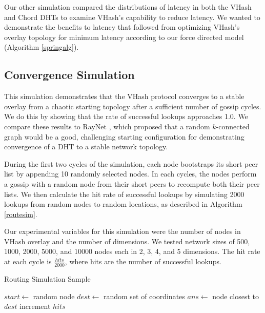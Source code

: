 \documentclass[10pt, conference, letterpaper]{IEEEtran}
\begin{document}
Our other simulation compared the distributions of latency in both the VHash and Chord DHTs to examine VHash's capability to reduce latency. 
We wanted to demonstrate the benefits to latency that followed from optimizing VHash's overlay topology for minimum latency according to our force directed model (Algorithm \ref{springalg}).

\subsection{Convergence Simulation}
This simulation demonstrates that the VHash protocol converges to a stable overlay from a chaotic starting topology after a sufficient number of gossip cycles.  
We do this by showing that the rate of successful lookups approaches 1.0.
We compare these results to RayNet \cite{raynet}, which proposed that a random $k$-connected graph would be a good, challenging starting configuration for demonstrating convergence of a DHT to a stable network topology.

During the first two cycles of the simulation, each node bootstraps its short peer list by appending 10 randomly selected nodes.
In each cycles, the nodes perform a gossip with a random node from their short peers to recompute both their peer lists.
We then calculate the hit rate of successful lookups by simulating 2000 lookups from random nodes to random locations, as described in Algorithm \ref{routesim}.

Our experimental variables for this simulation were the number of nodes in VHash overlay and the number of dimensions.  
We tested network sizes of 500, 1000, 2000, 5000, and 10000 nodes each in 2, 3, 4, and 5 dimensions.
The hit rate at each cycle is $\frac{hits}{2000}$, where hits are the number of successful lookups.

 


\begin{algorithm}
\caption{Routing Simulation Sample}
\label{routesim}
\begin{algorithmic}[1]  %
	\STATE $start \leftarrow$ random node
	\STATE $dest \leftarrow$ random set of coordinates
    \STATE $ans \leftarrow$ node closest to $dest$
    	\STATE increment $hits$
    \ENDIF
\end{algorithmic} 
\end{algorithm}


\end{document}
